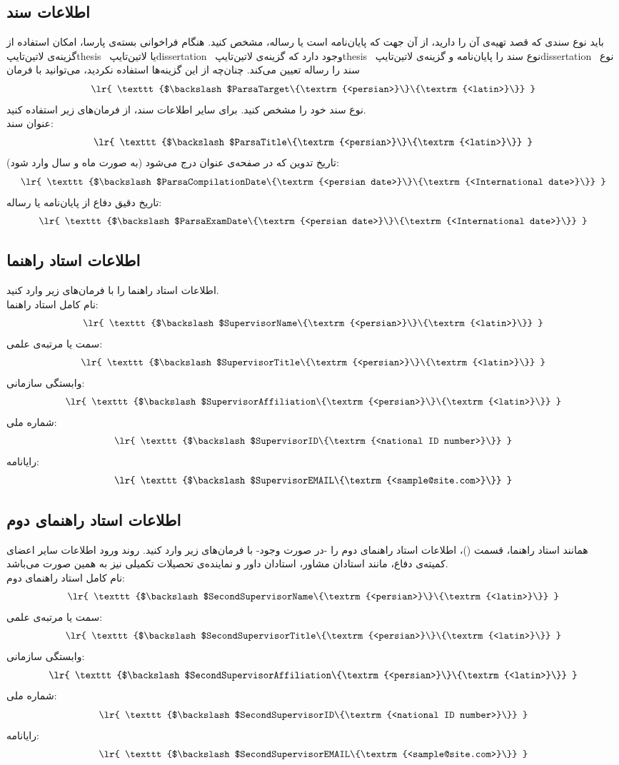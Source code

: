 \documentclass[12pt,a4paper,twoside,fleqn,notitlepage,openany]{extarticle}
\begin{document}
\subsection{اطلاعات سند} \label{ParsaInf}
باید نوع سندی که قصد تهیه‌‌ی آن را دارید، از آن جهت که پایان‌نامه است یا رساله، مشخص کنید\@. هنگام فراخوانی بسته‌ی پارسا، امکان استفاده از گزینه‌ی ‌لاتین{‌تایپ{thesis}} ~یا ‌لاتین{‌تایپ{dissertation}} ~وجود دارد که گزینه‌ی ‌لاتین{‌تایپ{thesis}} ~نوع سند را پایان‌نامه و گزینه‌ی ‌لاتین{‌تایپ{dissertation}} ~نوع سند را رساله تعیین می‌کند. چنان‌چه از این گزینه‌ها استفاده نکردید، می‌توانید با فرمان
\[ \textrm{ \lr{ \texttt{$\backslash$ParsaTarget\{\textrm{<persian>}\}\{\textrm{<latin>}\}} } } \]
نوع سند خود را مشخص کنید\@. برای سایر اطلاعات سند، از فرمان‌های زیر استفاده کنید\@. \\
عنوان سند:
\[ \textrm{ \lr{ \texttt{$\backslash$ParsaTitle\{\textrm{<persian>}\}\{\textrm{<latin>}\}} } } \]
تاریخ تدوین که در صفحه‌ی عنوان درج می‌شود (به صورت ماه و سال وارد شود):
\[ \textrm{ \lr{ \texttt{$\backslash$ParsaCompilationDate\{\textrm{<persian date>}\}\{\textrm{<International date>}\}} } } \]
تاریخ دقیق دفاع از پایان‌نامه یا رساله:
\[ \textrm{ \lr{ \texttt{$\backslash$ParsaExamDate\{\textrm{<persian date>}\}\{\textrm{<International date>}\}} } } \]
\subsection{اطلاعات استاد راهنما} \label{SupInf}
اطلاعات استاد راهنما را با فرمان‌های زیر وارد کنید\@. \\
نام کامل استاد راهنما:
\[ \textrm{ \lr{ \texttt{$\backslash$SupervisorName\{\textrm{<persian>}\}\{\textrm{<latin>}\}} } } \]
سمت یا مرتبه‌ی علمی:
\[ \textrm{ \lr{ \texttt{$\backslash$SupervisorTitle\{\textrm{<persian>}\}\{\textrm{<latin>}\}} } } \]
وابستگی سازمانی:
\[ \textrm{ \lr{ \texttt{$\backslash$SupervisorAffiliation\{\textrm{<persian>}\}\{\textrm{<latin>}\}} } } \]
شماره ملی:
\[ \textrm{ \lr{ \texttt{$\backslash$SupervisorID\{\textrm{<national ID number>}\}} } } \]
رایانامه:
\[ \textrm{ \lr{ \texttt{$\backslash$SupervisorEMAIL\{\textrm{<sample@site.com>}\}} } } \]
\subsection{اطلاعات استاد راهنمای دوم}
همانند استاد راهنما، قسمت ()، اطلاعات استاد راهنمای دوم را -در صورت وجود- با فرمان‌های زیر وارد کنید\@. روند ورود اطلاعات سایر اعضای کمیته‌ی دفاع، مانند استادان مشاور، استادان داور و نماینده‌ی تحصیلات تکمیلی نیز به همین صورت می‌باشد\@. \\
نام کامل استاد راهنمای دوم:
\[ \textrm{ \lr{ \texttt{$\backslash$SecondSupervisorName\{\textrm{<persian>}\}\{\textrm{<latin>}\}} } } \]
سمت یا مرتبه‌ی علمی:
\[ \textrm{ \lr{ \texttt{$\backslash$SecondSupervisorTitle\{\textrm{<persian>}\}\{\textrm{<latin>}\}} } } \]
وابستگی سازمانی:
\[ \textrm{ \lr{ \texttt{$\backslash$SecondSupervisorAffiliation\{\textrm{<persian>}\}\{\textrm{<latin>}\}} } } \]
شماره ملی:
\[ \textrm{ \lr{ \texttt{$\backslash$SecondSupervisorID\{\textrm{<national ID number>}\}} } } \]
رایانامه:
\[ \textrm{ \lr{ \texttt{$\backslash$SecondSupervisorEMAIL\{\textrm{<sample@site.com>}\}} } } \]
\end{document}

